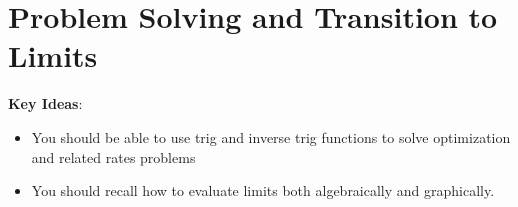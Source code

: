 \documentclass[main]{subfiles}
\begin{document}
\ifSubfilesClassLoaded{%
  \chaptermark{\chapterthree}
}{}

\section{Problem Solving and Transition to Limits} \label{ws3-6}

\begin{problemonly}
    \begin{framed}

\textbf{Key Ideas}:

\begin{itemize}[topsep=0pt,partopsep=0pt,parsep=8pt,itemsep=0pt]

\item You should be able to use trig and inverse trig functions to solve optimization and related rates problems

\item You should recall how to evaluate limits both algebraically and graphically.

\end{itemize}
\end{framed}
\end{problemonly}
\end{document}
